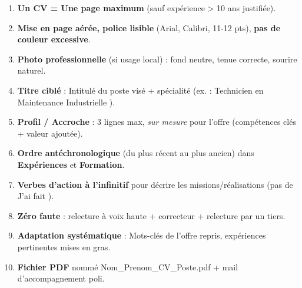 \documentclass[11pt]{article}
\begin{document}
\begin{aretenir}
\begin{enumerate}
    \item \textbf{Un CV = Une page maximum} (sauf expérience > 10 ans justifiée).
    \item \textbf{Mise en page aérée, police lisible} (Arial, Calibri, 11-12 pts), \textbf{pas de couleur excessive}.
    \item \textbf{Photo professionnelle} (si usage local) : fond neutre, tenue correcte, sourire naturel.
    \item \textbf{Titre ciblé} : Intitulé du poste visé + spécialité (ex. : \guillemotleft Technicien en Maintenance Industrielle \guillemotright).
    \item \textbf{Profil / Accroche} : 3 lignes max, \emph{sur mesure} pour l'offre (compétences clés + valeur ajoutée).
    \item \textbf{Ordre antéchronologique} (du plus récent au plus ancien) dans \textbf{Expériences} et \textbf{Formation}.
    \item \textbf{Verbes d'action à l'infinitif} pour décrire les missions/réalisations (pas de \guillemotleft J'ai fait \guillemotright).
    \item \textbf{Zéro faute} : relecture à voix haute + correcteur + relecture par un tiers.
    \item \textbf{Adaptation systématique} : Mots-clés de l'offre repris, expériences pertinentes mises en gras.
    \item \textbf{Fichier PDF} nommé \guillemotleft Nom\_Prenom\_CV\_Poste.pdf \guillemotright + mail d'accompagnement poli.
\end{enumerate}
\end{aretenir}
\end{document}
